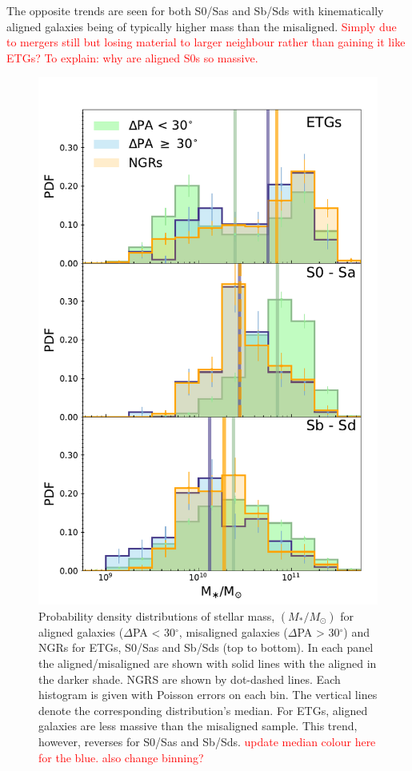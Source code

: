 \documentclass[fleqn,usenatbib]{mnras}
\newcommand{\red}[1]{{\textcolor{red}{#1}}}
\begin{document}
The opposite trends are seen for both S0/Sas and Sb/Sds with kinematically aligned galaxies being of typically higher mass than the misaligned. \red{Simply due to mergers still but losing material to larger neighbour rather than gaining it like ETGs? To explain: why are aligned S0s so massive.} 

\begin{figure}
	\includegraphics[width=\linewidth]{morph/delPA_stelM_morph.pdf}
    \caption{Probability density distributions of stellar mass, $(M_{\ast}/M_{\odot})$ for aligned galaxies ($\Delta$PA < 30$^{\circ}$, misaligned galaxies ($\Delta$PA > 30$^{\circ}$) and NGRs for ETGs, S0/Sas and Sb/Sds (top to bottom). In each panel the aligned/misaligned are shown with solid lines with the aligned in the darker shade. NGRS are shown by dot-dashed lines. Each histogram is given with Poisson errors on each bin. The vertical lines denote the corresponding distribution's median. For ETGs, aligned galaxies are less massive than the misaligned sample. This trend, however, reverses for S0/Sas and Sb/Sds. \red{update median colour here for the blue. also change binning?}}
    \label{fig:morph_stelM}
\end{figure}
\end{document}
